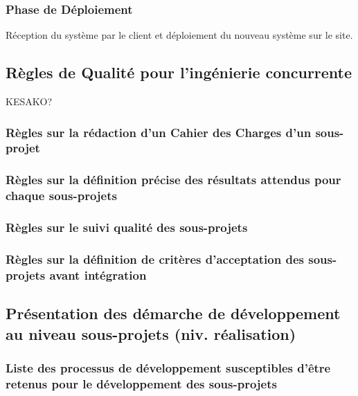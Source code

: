    \subsubsection{Phase de Déploiement}
    Réception du système par le client et déploiement du nouveau système sur le site.





\subsection{Règles de Qualité pour l’ingénierie concurrente}
\begin{center} \begin{Large}KESAKO?\end{Large}  \end{center}
\subsubsection{Règles sur la rédaction d’un Cahier des Charges d’un sous-projet}
\subsubsection{Règles sur la définition précise des résultats attendus pour chaque sous-projets}
\subsubsection{Règles sur le suivi qualité des sous-projets}
\subsubsection{Règles sur la définition de critères d’acceptation des sous-projets avant intégration}
\subsection{Présentation des démarche de développement au niveau sous-projets (niv. réalisation)}
\subsubsection{Liste des processus de développement susceptibles d’être retenus pour le développement des sous-projets}
